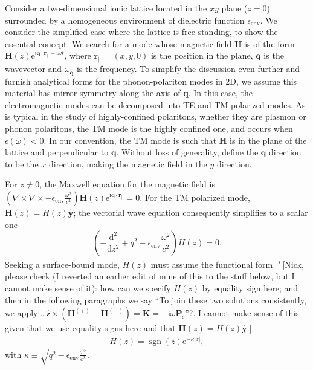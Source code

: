 \documentclass[aps,prb,twocolumn,
	groupedaddress,superscriptaddress,
	amsfonts,amssymb,amsmath,floatfix,
	citeautoscript]{revtex4-1}
\newcommand{\sgn}{\operatorname{sgn}}
\newcommand{\iu}{\mathrm{i}}
\newcommand{\e}{\mathrm{e}}
\newcommand{\dd}{\mathrm{d}}
\newcommand{\unitvec}[1]{\ensuremath{\hat{\mathbf{#1}}}}
\newcommand{\comment}[2]{\textcolor{blue!70!black}{\small\textsf{\textsuperscript{\textsc{\MakeLowercase{#1}}}[#2]}}}
\begin{document}
Consider a two-dimensional ionic lattice located in the $xy$ plane ($z=0$) surrounded by a homogeneous environment of dielectric function $\epsilon_{\mathrm{env}}$.
We consider the simplified case where the lattice is free-standing, to show the essential concept.
We search for a mode whose magnetic field $\mathbf{H}$ is of the form $\mathbf{H}(z)\e^{\iu\mathbf{q}\cdot\mathbf{r}_{\parallel} - \iu\omega t}$, where $\mathbf{r}_{\parallel}=(x,y,0)$ is the position in the plane, $\mathbf{q}$ is the wavevector and $\omega_{\mathbf{q}}$ is the frequency.
To simplify the discussion even further and furnish analytical forms for the phonon-polariton modes in 2D, we assume this material has mirror symmetry along the axis of $\mathbf{q}$.
In this case, the electromagnetic modes can be decomposed into TE and TM-polarized modes.
As is typical in the study of highly-confined polaritons, whether they are plasmon or phonon polaritons, the TM mode is the highly confined one, and occurs when $\epsilon(\omega) < 0$.
In our convention, the TM mode is such that $\mathbf{H}$ is in the plane of the lattice and perpendicular to $\mathbf{q}$. 
Without loss of generality, define the $\mathbf{q}$ direction to be the $x$ direction, making the magnetic field in the $y$ direction.
	

For $z \neq 0$, the Maxwell equation for the magnetic field is $(\nabla\times\nabla\times - \epsilon_{\mathrm{env}}\frac{\omega^2}{c^2})\mathbf{H}(z)\e^{\iu\mathbf{q}\cdot\mathbf{r}_{\parallel}} = 0$.
For the TM polarized mode, $\mathbf{H}(z) = H(z)\unitvec{y}$; the vectorial wave equation consequently simplifies to a scalar one
\begin{equation}\label{eq:2dmaxwell}
\left(-\frac{\dd^2}{\dd{}z^2}+q^2-\epsilon_{\mathrm{env}}\frac{\omega^2}{c^2} \right)H(z) = 0.
\end{equation}
Seeking a surface-bound mode, $H(z)$ must assume the functional form
	\comment{tc}{Nick, please check (I reverted an earlier edit of mine of this to the stuff below, but I cannot make sense of it): how can we specify $H(z)$ by equality sign here; and then in the following paragraphs we say ``To join these two solutions consistently, we apply \ldots$\unitvec{z}\times(\mathbf{H}^{(+)}-\mathbf{H}^{(-)}) = \mathbf{K} = -\iu\omega\mathbf{P}_{\mathrm{s}}$''?. I cannot make sense of this given that we use equality signs here and that $\mathbf{H}(z) = H(z)\unitvec{y}$.}
\begin{align}
	H(z) = \sgn(z)\e^{-\kappa |z|},
\end{align}
with $\kappa \equiv \sqrt{q^2-\epsilon_{\mathrm{env}}\frac{\omega^2}{c^2}}$.
\end{document}
